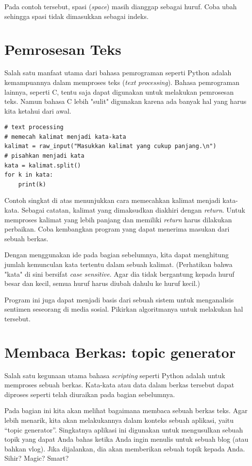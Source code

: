 Pada contoh tersebut, spasi ({\em space}) masih dianggap sebagai huruf.
Coba ubah sehingga spasi tidak dimasukkan sebagai indeks.


\section{Pemrosesan Teks}
Salah satu manfaat utama dari bahasa pemrograman seperti Python adalah
kemampuannya dalam memproses teks ({\em text processing}). Bahasa
pemrograman lainnya, seperti C, tentu saja dapat digunakan untuk melakukan
pemrosesan teks. Namun bahasa C lebih "sulit" digunakan karena ada banyak
hal yang harus kita ketahui dari awal.

\begin{verbatim}
# text processing
# memecah kalimat menjadi kata-kata
kalimat = raw_input("Masukkan kalimat yang cukup panjang.\n")
# pisahkan menjadi kata
kata = kalimat.split()
for k in kata:
    print(k)
\end{verbatim}

Contoh singkat di atas menunjukkan cara memecahkan kalimat menjadi kata-kata.
Sebagai catatan, kalimat yang dimaksudkan diakhiri dengan {\em return}. 
Untuk memproses kalimat yang lebih panjang dan memiliki {\em return} harus 
dilakukan perbaikan.
Coba kembangkan program yang dapat menerima masukan dari sebuah berkas.

Dengan menggunakan ide pada bagian sebelumnya, kita dapat menghitung
jumlah kemunculan kata tertentu dalam sebuah kalimat. (Perhatikan bahwa
"kata" di sini bersifat {\em case sensitive}. Agar dia tidak bergantung
kepada huruf besar dan kecil, semua huruf harus diubah dahulu ke
huruf kecil.)

Program ini juga dapat menjadi basis dari sebuah sistem untuk menganalisis
sentimen seseorang di media sosial. Pikirkan algoritmanya untuk melakukan
hal tersebut.


\section{Membaca Berkas: topic generator}
Salah satu kegunaan utama bahasa {\em scripting} seperti Python adalah
untuk memproses sebuah berkas. Kata-kata atau data dalam berkas tersebut
dapat diproses seperti telah diuraikan pada bagian sebelumnya.

Pada bagian ini kita akan melihat bagaimana membaca sebuah berkas teks.
Agar lebih menarik, kita akan melakukannya dalam konteks sebuah aplikasi,
yaitu ``topic generator''. Singkatnya aplikasi ini digunakan untuk
mengusulkan sebuah topik yang dapat Anda bahas ketika Anda ingin
menulis untuk sebuah blog (atau bahkan vlog).
Jika dijalankan, dia akan memberikan sebuah topik kepada Anda.
Sihir? Magic? Smart?

